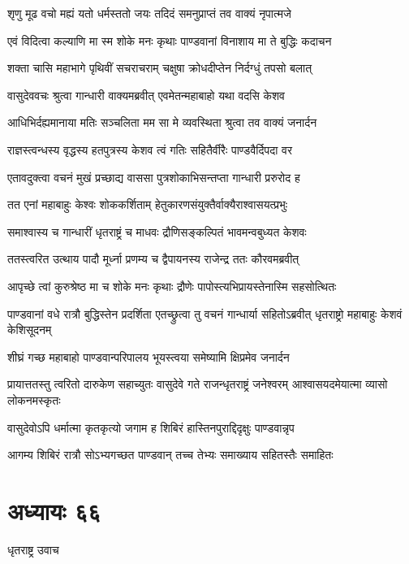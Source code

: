 \twolineshloka
{शृणु मूढ वचो मह्यं यतो धर्मस्ततो जयः}
{तदिदं समनुप्राप्तं तव वाक्यं नृपात्मजे}


\twolineshloka
{एवं विदित्वा कल्याणि मा स्म शोके मनः कृथाः}
{पाण्डवानां विनाशाय मा ते बुद्धिः कदाचन}


\twolineshloka
{शक्ता चासि महाभागे पृथिवीं सचराचराम्}
{चक्षुषा क्रोधदीप्तेन निर्दग्धुं तपसो बलात्}


\twolineshloka
{वासुदेववचः श्रुत्वा गान्धारी वाक्यमब्रवीत्}
{एवमेतन्महाबाहो यथा वदसि केशव}


\twolineshloka
{आधिभिर्दह्यमानाया मतिः सञ्चलिता मम}
{सा मे व्यवस्थिता श्रुत्वा तव वाक्यं जनार्दन}


\twolineshloka
{राज्ञस्त्वन्धस्य वृद्धस्य हतपुत्रस्य केशव}
{त्वं गतिः सहितैर्वीरैः पाण्डवैर्दिपदा वर}


\twolineshloka
{एतावदुक्त्वा वचनं मुखं प्रच्छाद्य वाससा}
{पुत्रशोकाभिसन्तप्ता गान्धारी प्ररुरोद ह}


\twolineshloka
{तत एनां महाबाहुः केश्वः शोककर्शिताम्}
{हेतुकारणसंयुक्तैर्वाक्यैराश्वासयत्प्रभुः}


\twolineshloka
{समाश्वास्य च गान्धारीं धृतराष्ट्रं च माधवः}
{द्रौणिसङ्कल्पितं भावमन्वबुध्यत केशवः}


\twolineshloka
{ततस्त्वरित उत्थाय पादौ मूर्ध्ना प्रणम्य च}
{द्वैपायनस्य राजेन्द्र ततः कौरवमब्रवीत्}


\twolineshloka
{आपृच्छे त्वां कुरुश्रेष्ठ मा च शोके मनः कृथाः}
{द्रौणेः पापोस्त्यभिप्रायस्तेनास्मि सहसोत्थितः}


पाण्डवानां वधे रात्रौ बुद्धिस्तेन प्रदर्शिता
\twolineshloka
{एतच्छ्रुत्वा तु वचनं गान्धार्या सहितोऽब्रवीत्}
{धृतराष्ट्रो महाबाहुः केशवं केशिसूदनम्}


\twolineshloka
{शीघ्रं गच्छ महाबाहो पाण्डवान्परिपालय}
{भूयस्त्वया समेष्यामि क्षिप्रमेव जनार्दन}


प्रायात्ततस्तु त्वरितो दारुकेण सहाच्युतः
\twolineshloka
{वासुदेवे गते राजन्धृतराष्ट्रं जनेश्वरम्}
{आश्वासयदमेयात्मा व्यासो लोकनमस्कृतः}


\twolineshloka
{वासुदेवोऽपि धर्मात्मा कृतकृत्यो जगाम ह}
{शिबिरं हास्तिनपुराद्दिदृक्षुः पाण्डवान्नृप}


\twolineshloka
{आगम्य शिबिरं रात्रौ सोऽभ्यगच्छत पाण्डवान्}
{तच्च तेभ्यः समाख्याय सहितस्तैः समाहितः}


\chapter{अध्यायः ६६}
\twolineshloka
{धृतराष्ट्र उवाच}
{}


